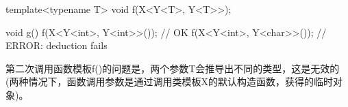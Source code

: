 \begin{cpp}
template<typename T>
void f(X<Y<T>, Y<T>>);

void g()
{
	f(X<Y<int>, Y<int>>()); // OK
	f(X<Y<int>, Y<char>>()); // ERROR: deduction fails
}
\end{cpp}

第二次调用函数模板f()的问题是，两个参数T会推导出不同的类型，这是无效的(两种情况下，函数调用参数是通过调用类模板X的默认构造函数，获得的临时对象)。
































